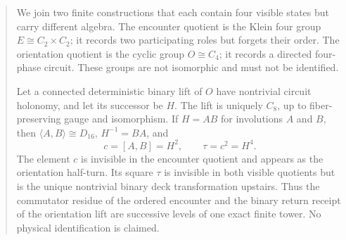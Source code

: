 \begin{abstract}
We join two finite constructions that each contain four visible states
but carry different algebra. The encounter quotient is the Klein four
group \(E\cong C_2\times C_2\); it records two participating roles but
forgets their order. The orientation quotient is the cyclic group
\(O\cong C_4\); it records a directed four-phase circuit. These groups
are not isomorphic and must not be identified.

Let a connected deterministic binary lift of \(O\) have nontrivial
circuit holonomy, and let its successor be \(H\). The lift is uniquely
\(C_8\), up to fiber-preserving gauge and isomorphism. If
\(H=AB\) for involutions \(A\) and \(B\), then
\(\langle A,B\rangle\cong D_{16}\), \(H^{-1}=BA\), and
\[
c=[A,B]=H^2,
\qquad
\tau=c^2=H^4.
\]
The element \(c\) is invisible in the encounter quotient and appears
as the orientation half-turn. Its square \(\tau\) is invisible in both
visible quotients but is the unique nontrivial binary deck
transformation upstairs. Thus the commutator residue of the ordered
encounter and the binary return receipt of the orientation lift are
successive levels of one exact finite tower. No physical
identification is claimed.
\end{abstract}
